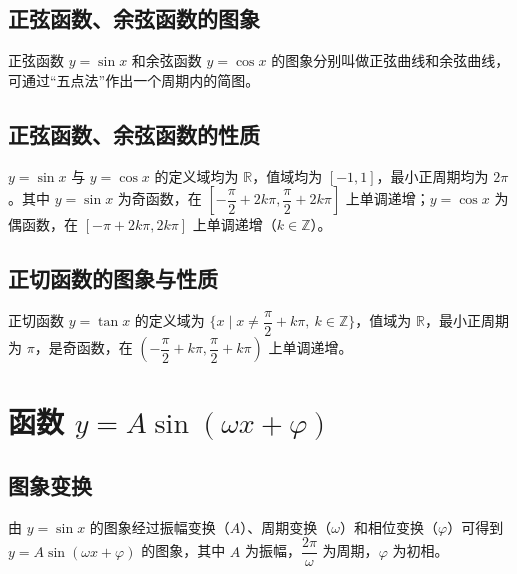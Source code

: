 \subsection{正弦函数、余弦函数的图象}
\begin{definition}
正弦函数 $y=\sin x$ 和余弦函数 $y=\cos x$ 的图象分别叫做正弦曲线和余弦曲线，可通过“五点法”作出一个周期内的简图。
\end{definition}
\subsection{正弦函数、余弦函数的性质}
\begin{definition}
$y=\sin x$ 与 $y=\cos x$ 的定义域均为 $\mathbb{R}$，值域均为 $[-1,1]$，最小正周期均为 $2\pi$。其中 $y=\sin x$ 为奇函数，在 $\left[-\dfrac{\pi}{2}+2k\pi,\dfrac{\pi}{2}+2k\pi\right]$ 上单调递增；$y=\cos x$ 为偶函数，在 $[-\pi+2k\pi,2k\pi]$ 上单调递增（$k \in \mathbb{Z}$）。
\end{definition}
\subsection{正切函数的图象与性质}
\begin{definition}[正切函数的图象与性质]
正切函数 $y=\tan x$ 的定义域为 $\{x \mid x \neq \dfrac{\pi}{2}+k\pi,\ k \in \mathbb{Z}\}$，值域为 $\mathbb{R}$，最小正周期为 $\pi$，是奇函数，在 $\left(-\dfrac{\pi}{2}+k\pi,\dfrac{\pi}{2}+k\pi\right)$ 上单调递增。
\end{definition}

\section{函数 \texorpdfstring{$y=A\sin(\omega x+\varphi)$}{y=Asin(ωx+φ)}}
\subsection{图象变换}
\begin{definition}[图象变换]
由 $y=\sin x$ 的图象经过振幅变换（$A$）、周期变换（$\omega$）和相位变换（$\varphi$）可得到 $y=A\sin(\omega x+\varphi)$ 的图象，其中 $A$ 为振幅，$\dfrac{2\pi}{\omega}$ 为周期，$\varphi$ 为初相。
\end{definition}
